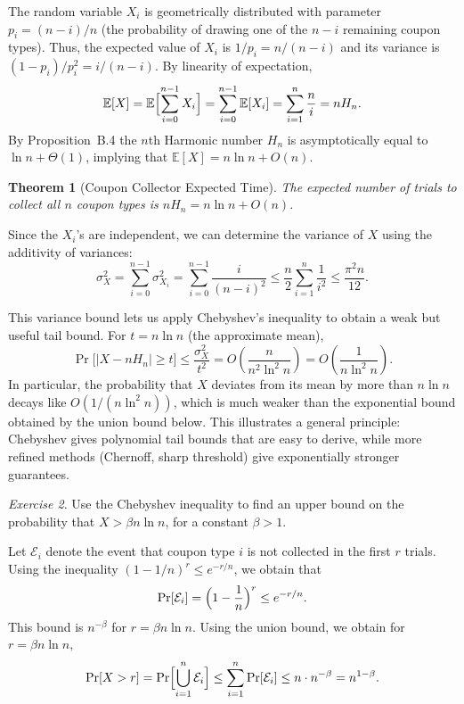 \documentclass[twoside,12pt]{book}
\theoremstyle{plain}
\newtheorem{theorem}{Theorem}[chapter]
\theoremstyle{definition}
\theoremstyle{remark}
\newtheorem{exercise}[theorem]{Exercise}
\begin{document}
The random variable $X_i$ is geometrically distributed with parameter $p_i = (n-i)/n$ (the probability of drawing one of the $n-i$ remaining coupon types). Thus, the expected value of $X_i$ is $1/p_i = n/(n-i)$ and its variance is $(1-p_i)/p_i^2 = i/(n-i)$. By linearity of expectation,
\[
\mathbb{E}[X] = \mathbb{E}\Bigl[\sum_{i=0}^{n-1} X_i\Bigr] = \sum_{i=0}^{n-1} \mathbb{E}[X_i] = \sum_{i=1}^{n} \frac{n}{i} = n H_n.
\]
By Proposition~B.4 the $n$th Harmonic number $H_n$ is asymptotically equal to $\ln n + \Theta(1)$, implying that $\mathbb{E}[X] = n \ln n + O(n)$.

\begin{theorem}[Coupon Collector Expected Time]
\label{thm:coupon-expect}
The expected number of trials to collect all $n$ coupon types is $n H_n = n \ln n + O(n)$.
\end{theorem}

Since the $X_i$'s are independent, we can determine the variance of $X$ using the additivity of variances:
\[
\sigma_X^2 = \sum_{i=0}^{n-1} \sigma_{X_i}^2 = \sum_{i=0}^{n-1} \frac{i}{(n-i)^2} \leq \frac{n}{2} \sum_{i=1}^{n} \frac{1}{i^2} \leq \frac{\pi^2 n}{12}.
\]

This variance bound lets us apply Chebyshev's inequality to obtain a
weak but useful tail bound.  For $t = n \ln n$ (the approximate mean),
\[
\Pr\!\bigl[|X - n H_n| \geq t\bigr] \leq \frac{\sigma_X^2}{t^2}
= O\!\left(\frac{n}{n^2 \ln^2 n}\right) = O\!\left(\frac{1}{n \ln^2 n}\right).
\]
In particular, the probability that $X$ deviates from its mean by
more than $n \ln n$ decays like $O(1/(n \ln^2 n))$, which is much
weaker than the exponential bound obtained by the union bound below.
This illustrates a general principle: Chebyshev gives polynomial tail
bounds that are easy to derive, while more refined methods (Chernoff,
sharp threshold) give exponentially stronger guarantees.

\begin{exercise}
Use the Chebyshev inequality to find an upper bound on the probability that $X > \beta n \ln n$, for a constant $\beta > 1$.
\end{exercise}

Let $\mathcal{E}_i$ denote the event that coupon type $i$ is not collected in the first $r$ trials. Using the inequality $(1 - 1/n)^r \leq e^{-r/n}$, we obtain that
\[
\Pr[\mathcal{E}_i] = \Bigl(1 - \frac{1}{n}\Bigr)^r \leq e^{-r/n}.
\]
This bound is $n^{-\beta}$ for $r = \beta n \ln n$. Using the union bound, we obtain for $r = \beta n \ln n$,
\[
\Pr[X > r] = \Pr\Bigl[\bigcup_{i=1}^{n} \mathcal{E}_i\Bigr] \leq \sum_{i=1}^{n} \Pr[\mathcal{E}_i] \leq n \cdot n^{-\beta} = n^{1-\beta}.
\]
\end{document}
